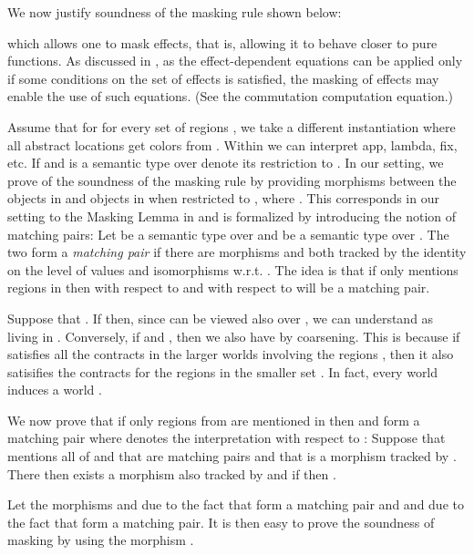 \documentclass[orivec]{llncs}
\renewcommand{\paragraph}[1]{\noindent {\bf #1}}
\begin{document}
\paragraph{Masking}
We now justify soundness of the masking rule shown below:

which allows one to mask effects, that is, allowing it to behave closer to
pure functions. As discussed in \cite{DBLP:conf/ppdp/BentonKBH07}, as the
effect-dependent equations can be applied only if some conditions on the
set of effects is satisfied, the masking of effects may enable the use of
such equations. (See the commutation computation equation.)

Assume that for 
for every set of regions , we take a different instantiation 
where all abstract locations get colors from . Within  we can
interpret app, lambda, fix, etc.
If  and  is a semantic type over  denote  its restriction to . 
In our setting, we prove of the soundness of the
masking rule by providing morphisms between the objects in
 and objects in  when restricted to , where . This corresponds in our
setting to the Masking Lemma in \cite{DBLP:conf/ppdp/BentonKBH07} and is
formalized by introducing the notion of matching pairs:
 Let  be a semantic
type over  and  be a semantic type over
. The two form a \emph{matching pair} if there are morphisms
 and  both tracked by the identity on the
level of values and isomorphisms w.r.t. . The idea is that if 
only mentions regions in  then  with respect to  and
 with respect to  will be a matching pair.




Suppose that . 
If  then, since  can be viewed also over ,
we can understand  as living in . Conversely, if  and , then we also have 
 by coarsening. This is because if 
satisfies all the contracts in the larger worlds involving the regions
, then it also satisifies the contracts for the regions in the smaller
set . In fact, every world  induces a world .

We now prove that if only regions from  are mentioned in  then
 and  form a matching pair where 
denotes the interpretation with respect to : Suppose that 
mentions all of  and that 
are matching pairs and that  is a morphism tracked
by . There then exists a morphism   also tracked by  and if  then .

Let the morphisms  and  due to the fact that
 form a matching pair and  and  due to the
fact that  form a matching pair. It is then easy to prove the
soundness of masking by using the morphism
.
\end{document}
